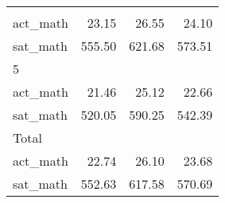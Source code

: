 \begin{table}[!h]
\begin{tabular}{llll}
  \multicolumn{1}{r}{} \\
\multicolumn{1}{l}{\hspace{2em}act\_math} &
  \multicolumn{1}{|r}{23.15} &
  \multicolumn{1}{r}{26.55} &
  \multicolumn{1}{r}{24.10} \\
\multicolumn{1}{l}{\hspace{2em}sat\_math} &
  \multicolumn{1}{|r}{555.50} &
  \multicolumn{1}{r}{621.68} &
  \multicolumn{1}{r}{573.51} \\
\multicolumn{1}{l}{\hspace{1em}5} &
  \multicolumn{1}{|r}{} &
  \multicolumn{1}{r}{} &
  \multicolumn{1}{r}{} \\
\multicolumn{1}{l}{\hspace{2em}act\_math} &
  \multicolumn{1}{|r}{21.46} &
  \multicolumn{1}{r}{25.12} &
  \multicolumn{1}{r}{22.66} \\
\multicolumn{1}{l}{\hspace{2em}sat\_math} &
  \multicolumn{1}{|r}{520.05} &
  \multicolumn{1}{r}{590.25} &
  \multicolumn{1}{r}{542.39} \\
\multicolumn{1}{l}{\hspace{1em}Total} &
  \multicolumn{1}{|r}{} &
  \multicolumn{1}{r}{} &
  \multicolumn{1}{r}{} \\
\multicolumn{1}{l}{\hspace{2em}act\_math} &
  \multicolumn{1}{|r}{22.74} &
  \multicolumn{1}{r}{26.10} &
  \multicolumn{1}{r}{23.68} \\
\multicolumn{1}{l}{\hspace{2em}sat\_math} &
  \multicolumn{1}{|r}{552.63} &
  \multicolumn{1}{r}{617.58} &
  \multicolumn{1}{r}{570.69} \\
\cline{1-4}
\end{tabular}
\end{table}
